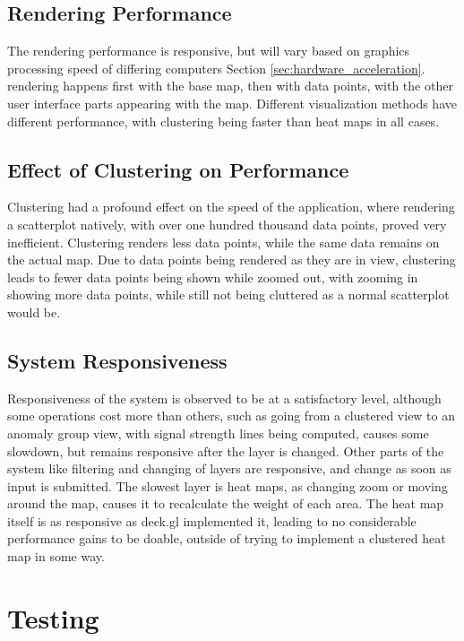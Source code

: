 \subsection{Rendering Performance}

The rendering performance is responsive, but will vary based on graphics processing speed of differing computers Section \ref{sec:hardware_acceleration}. rendering happens first with the base map, then with data points, with the other user interface parts appearing with the map. Different visualization methods have different performance, with clustering being faster than heat maps in all cases. 

\subsection{Effect of Clustering on Performance}

Clustering had a profound effect on the speed of the application, where rendering a scatterplot natively, with over one hundred thousand data points, proved very inefficient. Clustering renders less data points, while the same data remains on the actual map. Due to data points being rendered as they are in view, clustering leads to fewer data points being shown while zoomed out, with zooming in showing more data points, while still not being cluttered as a normal scatterplot would be. 

\subsection{System Responsiveness}

Responsiveness of the system is observed to be at a satisfactory level, although some operations cost more than others, such as going from a clustered view to an anomaly group view, with signal strength lines being computed, causes some slowdown, but remains responsive after the layer is changed. Other parts of the system like filtering and changing of layers are responsive, and change as soon as input is submitted. The slowest layer is heat maps, as changing zoom or moving around the map, causes it to recalculate the weight of each area. The heat map itself is as responsive as deck.gl implemented it, leading to no considerable performance gains to be doable, outside of trying to implement a clustered heat map in some way. 

\section{Testing}


